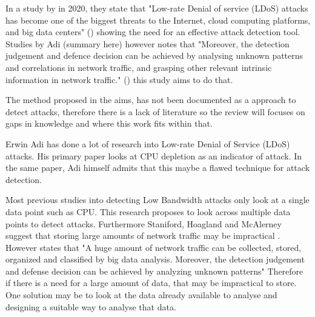 

In a study by \citeauthor{9016229} in 2020, they state that "Low-rate Denial of service (LDoS) attacks has become one of the biggest threats to the Internet, cloud computing platforms, and big data centers" (\cite{9016229}) showing the need for an effective attack detection tool. Studies by Adi (summary here) however \citeauthor{9016229} notes that "Moreover, the detection judgement and defence decision can be achieved by analysing unknown patterns and correlations in network traffic, and grasping other relevant intrinsic information in network traffic."  (\cite{9016229}) this study aims to do that.


The method proposed in the aims, has not been documented as a approach to detect attacks, therefore there is a lack of literature so the review will focuses on gaps in knowledge and where this work fits within that.


Erwin Adi has done a lot of research into Low-rate Denial of Service (LDoS) attacks. His primary paper looks at CPU depletion as an indicator of attack. In the same paper, Adi himself admits that this maybe a flawed technique for attack detection. \cite{Adi2016} 

Most previous studies into detecting Low Bandwidth attacks only look at a single data point such as CPU. This research proposes to look across multiple data points to detect attacks. Furthermore Staniford, Hoagland and McAlerney suggest that storing large amounts of network traffic may be impractical \cite{staniford2002practical}. However \citeauthor{9016229} states that "A huge amount of network traffic can be collected, stored, organized and classified by big data analysis. Moreover, the detection judgement and defense decision can be achieved by analyzing unknown patterns" \cite{9016229} Therefore if there is a need for a large amount of data, that may be impractical to store. One solution may be to look at the data already available to analyse and designing a suitable way to analyse that data.

